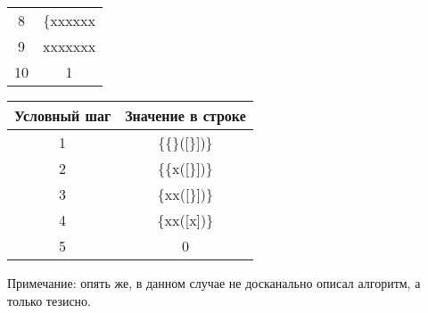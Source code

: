 \documentclass{article}
\begin{document}
\begin{enumerate}
\begin{center}
\begin{tabular}{c|c}
        8   & \{xxxxxx         \\
        9   & xxxxxxx          \\
        10  & 1                 \\
    \end{tabular} 
    \begin{tabular}{c|c}
        Условный шаг    & Значение в строке     \\ \hline
        1   & \{\{\}([\}])\}      \\
        2   & \{\{x([\}])\}       \\
        3   & \{xx([\}])\}        \\
        4   & \{xx([x])\}        \\
        5   & 0
    \end{tabular}
    \end{center}
    Примечание: опять же, в данном случае не досканально описал алгоритм, а только тезисно.
    

\end{enumerate}
\end{document}
